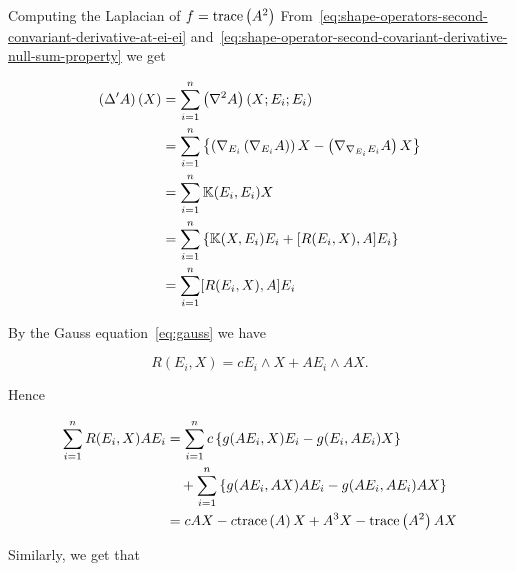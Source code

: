 \begin{frame}[allowframebreaks]{Computing the Laplacian of \(f=\text{trace}\left({A^{2}}\right)\)}
  From~\eqref{eq:shape-operators-second-convariant-derivative-at-ei-ei}
  and~\eqref{eq:shape-operator-second-covariant-derivative-null-sum-property}
  we get

  \framebreak 

  \begin{equation}\label{eq:formula-for-the-restricted-laplacian-of-A}
    \begin{split}
      \left(\Delta'{A}\right)(X) & = \sum_{i=1}^{n}\left(\nabla^{2}A\right)(X;E_{i};E_{i})                                                                                                    \\
                                              & =\sum_{i=1}^{n}\left\{\left(\nabla_{E_{i}}\left(\nabla_{E_{i}}A\right)\right)X-\left(\nabla_{\nabla_{E_{i}}E_{i}}A\right)X\right\} \\
                                              & =\sum_{i=1}^{n}\mathbb{K}(E_{i},E_{i})X                                                                                              \\
                                              & =\sum_{i=1}^{n}\left\{\mathbb{K}(X,E_{i})E_{i}+[R(E_{i},X),A]E_{i}\right\}                                                           \\
                                              & =\sum_{i=1}^{n}[R(E_{i},X),A]E_{i}
    \end{split}
  \end{equation}

  \framebreak

  By the Gauss equation~\eqref{eq:gauss} we have

  \[
    R(E_{i},X)=cE_{i}\wedge{X}+AE_{i}\wedge{AX}.
  \]

  Hence

  \framebreak

  \begin{align*}
    \sum_{i=1}^{n}R(E_{i},X)AE_{i} & =\sum_{i=1}^{n}c\left\{g(AE_{i},X)E_{i}-g(E_{i},AE_{i})X\right\}         \\
                                   & \quad+\sum_{i=1}^{n}\left\{g(AE_{i},AX)AE_{i}-g(AE_{i},AE_{i})AX\right\} \\
                                   & =cAX-c\text{trace}\left({A}\right)X+A^{3}X-\text{trace}\left({A^{2}}\right)AX
  \end{align*}

  Similarly, we get that


\end{frame}
